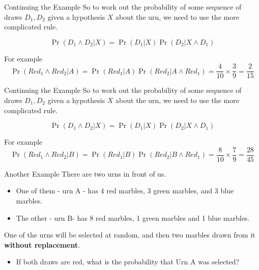 \documentclass[
  ignorenonframetext,
]{beamer}
\providecommand{\tightlist}{%
  \setlength{\itemsep}{0pt}\setlength{\parskip}{0pt}}
\renewcommand{\,}{\text{, }}
\begin{document}
\begin{frame}{Continuing the Example}
\protect\hypertarget{continuing-the-example}{}
So to work out the probability of some sequence of draws \(D_1, D_2\)
given a hypothesis \(X\) about the urn, we need to use the more
complicated rule.

\[
\Pr(D_1 \wedge D_2 | X) = \Pr(D_1 | X) \Pr(D_2 | X \wedge D_1)
\]

\pause

For example \[
\Pr(Red_1 \wedge Red_2 | A) = \Pr(Red_1 | A)\Pr(Red_2 | A \wedge Red_1) = \frac{4}{10} \times \frac{3}{9} = \frac{2}{15}
\]
\end{frame}

\begin{frame}{Continuing the Example}
\protect\hypertarget{continuing-the-example-1}{}
So to work out the probability of some sequence of draws \(D_1, D_2\)
given a hypothesis \(X\) about the urn, we need to use the more
complicated rule.

\[
\Pr(D_1 \wedge D_2 | X) = \Pr(D_1 | X) \Pr(D_2 | X \wedge D_1)
\]

For example \[
\Pr(Red_1 \wedge Red_2 | B) = \Pr(Red_1 | B)\Pr(Red_2 | B \wedge Red_1) = \frac{8}{10} \times \frac{7}{9} = \frac{28}{45}
\]
\end{frame}

\begin{frame}{Another Example}
\protect\hypertarget{another-example}{}
There are two urns in front of us.

\begin{itemize}
\tightlist
\item
  One of them - urn A - has 4 red marbles, 3 green marbles, and 3 blue
  marbles.
\item
  The other - urn B- has 8 red marbles, 1 green marbles and 1 blue
  marbles. \pause
\end{itemize}

One of the urns will be selected at random, and then two marbles drawn
from it \textbf{without replacement}.

\begin{itemize}
\tightlist
\item
  If both draws are red, what is the probability that Urn A was
  selected?
\end{itemize}
\end{frame}
\end{document}

